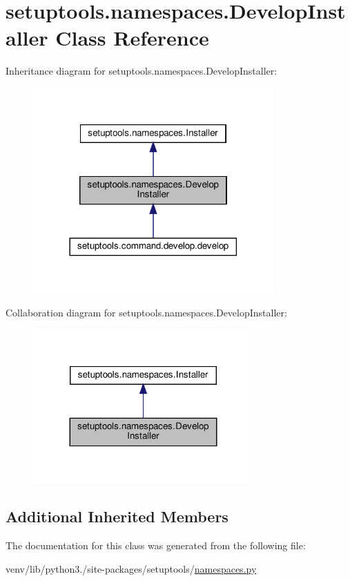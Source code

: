 \hypertarget{classsetuptools_1_1namespaces_1_1DevelopInstaller}{}\section{setuptools.\+namespaces.\+Develop\+Installer Class Reference}
\label{classsetuptools_1_1namespaces_1_1DevelopInstaller}


Inheritance diagram for setuptools.\+namespaces.\+Develop\+Installer\+:
\nopagebreak
\begin{figure}[H]
\begin{center}
\leavevmode
\includegraphics[width=261pt]{classsetuptools_1_1namespaces_1_1DevelopInstaller__inherit__graph}
\end{center}
\end{figure}


Collaboration diagram for setuptools.\+namespaces.\+Develop\+Installer\+:
\nopagebreak
\begin{figure}[H]
\begin{center}
\leavevmode
\includegraphics[width=239pt]{classsetuptools_1_1namespaces_1_1DevelopInstaller__coll__graph}
\end{center}
\end{figure}
\subsection*{Additional Inherited Members}


The documentation for this class was generated from the following file\+:\begin{DoxyCompactItemize}
\item 
venv/lib/python3./site-\/packages/setuptools/\hyperlink{namespaces_8py}{namespaces.\+py}\end{DoxyCompactItemize}
